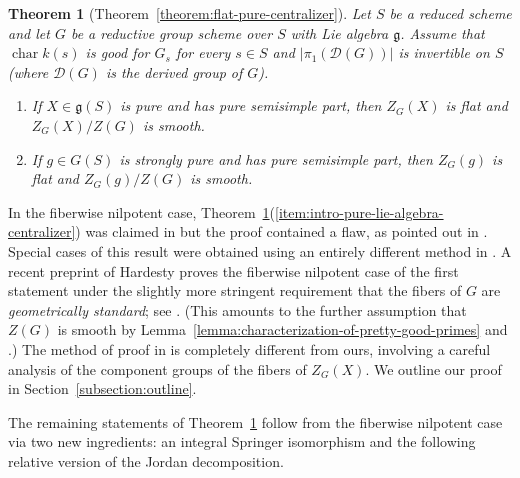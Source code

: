\documentclass[11pt,reqno]{amsart}
\newtheorem{theorem}{Theorem}[section]
\theoremstyle{definition}
\newcommand{\sD}{{\mathscr D}}
\newcommand{\fg}{\mathfrak{g}}
\DeclareMathOperator{\chara}{char}
\begin{document}
\begin{theorem}[Theorem~\ref{theorem:flat-pure-centralizer}]\label{theorem:intro-flat-pure-centralizer}
Let $S$ be a reduced scheme and let $G$ be a reductive group scheme over $S$ with Lie algebra $\fg$. Assume that $\chara k(s)$ is good for $G_s$ for every $s \in S$ and $|\pi_1(\sD(G))|$ is invertible on $S$ (where $\sD(G)$ is the derived group of $G$).
\begin{enumerate}
    \item\label{item:intro-pure-lie-algebra-centralizer} If $X \in \fg(S)$ is pure and has pure semisimple part, then $Z_G(X)$ is flat and $Z_G(X)/Z(G)$ is smooth.
    \item\label{item:intro-pure-group-centralizer} If $g \in G(S)$ is strongly pure and has pure semisimple part, then $Z_G(g)$ is flat and $Z_G(g)/Z(G)$ is smooth.
\end{enumerate}
\end{theorem}

In the fiberwise nilpotent case, Theorem~\ref{theorem:intro-flat-pure-centralizer}(\ref{item:intro-pure-lie-algebra-centralizer}) was claimed in \cite[5.2]{McNinch-relative-centralizer} but the proof contained a flaw, as pointed out in \cite[Rmk.\ 4.20]{Booher}. Special cases of this result were obtained using an entirely different method in \cite[Prop.\ 4.17]{Booher}. A recent preprint of Hardesty \cite{Hardesty} proves the fiberwise nilpotent case of the first statement under the slightly more stringent requirement that the fibers of $G$ are \textit{geometrically standard}; see \cite[1.6]{Hardesty}. (This amounts to the further assumption that $Z(G)$ is smooth by Lemma~\ref{lemma:characterization-of-pretty-good-primes} and \cite[Thm.\ 5.2]{Herpel}.) The method of proof in \cite{Hardesty} is completely different from ours, involving a careful analysis of the component groups of the fibers of $Z_G(X)$. We outline our proof in Section~\ref{subsection:outline}.\smallskip

The remaining statements of Theorem~\ref{theorem:intro-flat-pure-centralizer} follow from the fiberwise nilpotent case via two new ingredients: an integral Springer isomorphism \cite[Thm.\ 5.1]{Integral-Springer} and the following relative version of the Jordan decomposition.
\end{document}
